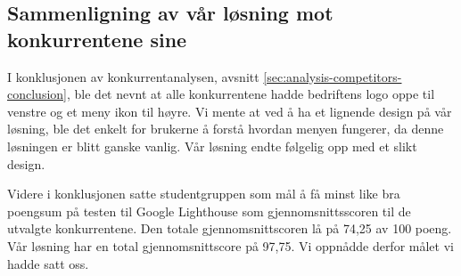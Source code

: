 \subsection{Sammenligning av vår løsning mot konkurrentene sine}
I konklusjonen av konkurrentanalysen, avsnitt \ref{sec:analysis-competitors-conclusion}, ble det nevnt at alle konkurrentene hadde bedriftens logo oppe til venstre og et meny ikon til høyre. Vi mente at ved å ha et lignende design på vår løsning, ble det enkelt for brukerne å forstå hvordan menyen fungerer, da denne løsningen er blitt ganske vanlig. Vår løsning endte følgelig opp med et slikt design.

Videre i konklusjonen satte studentgruppen som mål å få minst like bra poengsum på testen til Google Lighthouse som gjennomsnittsscoren til de utvalgte konkurrentene. Den totale gjennomsnittscoren lå på 74,25 av 100 poeng. Vår løsning har en total gjennomsnittscore på 97,75. Vi oppnådde derfor målet vi hadde satt oss.